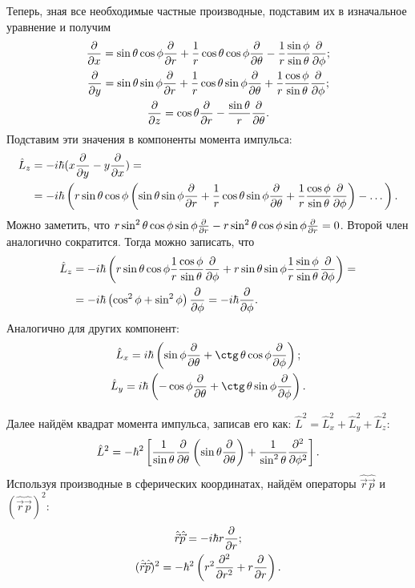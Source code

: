 Теперь, зная все необходимые частные производные, подставим их в изначальное
уравнение и получим
\begin{gather*}
  \frac{\partial }{\partial x} = \sin\theta\cos\phi\frac{\partial }{\partial r} + \frac{1}{r}\cos\theta\cos\phi\frac{\partial }{\partial \theta} -\frac{1}{r}\frac{\sin\phi}{\sin\theta}\frac{\partial }{\partial \phi};\\
  \frac{\partial }{\partial y} = \sin\theta\sin\phi\frac{\partial }{\partial r} + \frac{1}{r}\cos\theta\sin\phi\frac{\partial }{\partial \theta} +\frac{1}{r}\frac{\cos\phi}{\sin\theta}\frac{\partial }{\partial \phi};\\
  \frac{\partial }{\partial z} = \cos\theta\frac{\partial }{\partial r} -\frac{\sin\theta}{r}\frac{\partial }{\partial \theta}.
\end{gather*}
Подставим эти значения в компоненты момента импульса:
\begin{align*}
  \hat{L}_z &= -i\hbar(x\frac{\partial }{\partial y} - y\frac{\partial }{\partial x}) =\\
  &= -i\hbar\left(r\sin\theta\cos\phi\left(\sin\theta\sin\phi\frac{\partial }{\partial r} + \frac{1}{r}\cos\theta\sin\phi\frac{\partial }{\partial \theta} +\frac{1}{r}\frac{\cos\phi}{\sin\theta}\frac{\partial }{\partial \phi}\right) - \dots \right).
\end{align*}
Можно заметить, что $r\sin^2\theta \cos\phi \sin\phi \frac{\partial }{\partial r} -
  r\sin^2\theta\cos\phi\sin\phi\frac{\partial }{\partial r} = 0$. Второй член аналогично сократится.
Тогда можно записать, что
\begin{align*}
  \hat{L}_z &= -i\hbar\left(r\sin\theta\cos\phi\frac{1}{r}\frac{\cos\phi}{\sin\theta}\frac{\partial }{\partial \phi} + r\sin\theta\sin\phi\frac{1}{r}\frac{\sin\phi}{\sin\theta}\frac{\partial }{\partial \phi} \right) =\\
  &= -i\hbar \left(\cos^2\phi+\sin^2\phi\right)\frac{\partial }{\partial \phi} = -i\hbar\frac{\partial }{\partial \phi}.
\end{align*}
Аналогично для других компонент:
\begin{gather*}
  \hat{L}_x = i\hbar\left(\sin\phi\pd{}{\theta} + \ctg\,\theta\cos\phi \pd{}{\phi}\right);\\
  \hat{L}_y = i\hbar\left(-\cos\phi\pd{}{\theta} + \ctg\,\theta\sin\phi \pd{}{\phi}\right).
\end{gather*}

Далее найдём квадрат момента импульса, записав его как: $\hat{L}^2 =
  \hat{L}^2_x + \hat{L}^2_y + \hat{L}^2_z$:
\[
  \hat{L}^2 = -\hbar^2\left[\frac{1}{\sin\theta}\frac{\partial }{\partial \theta}\left( \sin\theta\frac{\partial }{\partial \theta} \right) + \frac{1}{\sin^2\theta}\frac{\partial^2}{\partial\phi^2}\right].
\]
Используя производные в сферических координатах, найдём операторы
$\hat{\Vec{r}}\hat{\Vec{p}}$ и $(\hat{\Vec{r}}\hat{\Vec{p}})^2$:
\begin{gather*}
  \hat{\Vec{r}}\hat{\Vec{p}} = -i\hbar r\frac{\partial }{\partial r};\\
  (\hat{\Vec{r}}\hat{\Vec{p}})^2 = -\hbar^2\left( r^2\frac{\partial^2}{\partial r^2} + r\frac{\partial }{\partial r}\right).
\end{gather*}
\qedsq

